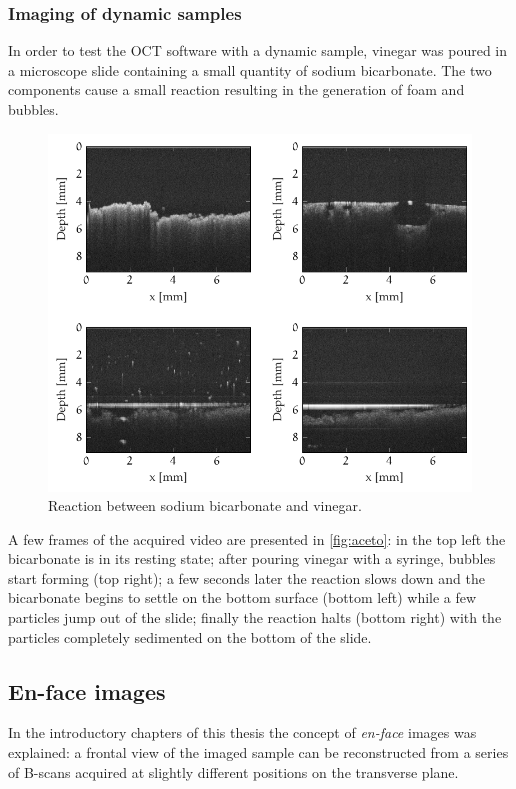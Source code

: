 \subsubsection{Imaging of dynamic samples}
In order to test the OCT software with a dynamic sample, vinegar was poured in a microscope slide containing a small quantity of sodium bicarbonate. The two components cause a small reaction resulting in the generation of foam and bubbles. 
\begin{figure}[htb]
	\centering
	\includegraphics[width=\linewidth]{gfx/ch4/santec/aceto}
	\caption[]{Reaction between sodium bicarbonate and vinegar.}\label{fig:aceto}
\end{figure}
A few frames of the acquired video are presented in \autoref{fig:aceto}: in the top left the bicarbonate is in its resting state; after pouring vinegar with a syringe, bubbles start forming (top right); a few seconds later the reaction slows down and the bicarbonate begins to settle on the bottom surface (bottom left) while a few particles jump out of the slide; finally the reaction halts (bottom right) with the particles completely sedimented on the bottom of the slide. 

\clearpage
\subsection{En-face images}
\label{sub:enface}
In the introductory chapters of this thesis the concept of \emph{en-face} images was explained: a frontal view of the imaged sample can be reconstructed from a series of B-scans acquired at slightly different positions on the transverse plane. 

